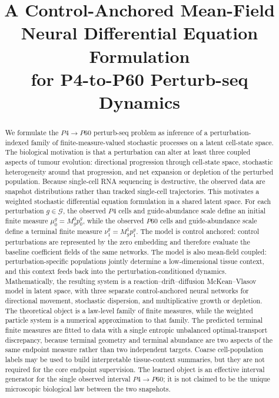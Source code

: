 \documentclass[11pt]{article}
\title{A Control-Anchored Mean-Field Neural Differential Equation Formulation\\for P4-to-P60 Perturb-seq Dynamics}
\author{}
\date{}
\newcommand{\Gcal}{\mathcal{G}}
\begin{document}
\maketitle

\begin{abstract}
We formulate the $P4 \to P60$ perturb-seq problem as inference of a perturbation-indexed family of finite-measure-valued stochastic processes on a latent cell-state space. The biological motivation is that a perturbation can alter at least three coupled aspects of tumour evolution: directional progression through cell-state space, stochastic heterogeneity around that progression, and net expansion or depletion of the perturbed population. Because single-cell RNA sequencing is destructive, the observed data are snapshot distributions rather than tracked single-cell trajectories. This motivates a weighted stochastic differential equation formulation in a shared latent space. For each perturbation $g \in \Gcal$, the observed $P4$ cells and guide-abundance scale define an initial finite measure $\mu_0^g=M_g^0p_0^g$, while the observed $P60$ cells and guide-abundance scale define a terminal finite measure $\nu_1^g=M_g^1p_1^g$. The model is control anchored: control perturbations are represented by the zero embedding and therefore evaluate the baseline coefficient fields of the same networks. The model is also mean-field coupled: perturbation-specific populations jointly determine a low-dimensional tissue context, and this context feeds back into the perturbation-conditioned dynamics. Mathematically, the resulting system is a reaction--drift--diffusion McKean--Vlasov model in latent space, with three separate control-anchored neural networks for directional movement, stochastic dispersion, and multiplicative growth or depletion. The theoretical object is a law-level family of finite measures, while the weighted particle system is a numerical approximation to that family. The predicted terminal finite measures are fitted to data with a single entropic unbalanced optimal-transport discrepancy, because terminal geometry and terminal abundance are two aspects of the same endpoint measure rather than two independent targets. Coarse cell-population labels may be used to build interpretable tissue-context summaries, but they are not required for the core endpoint supervision. The learned object is an effective interval generator for the single observed interval $P4 \to P60$; it is not claimed to be the unique microscopic biological law between the two snapshots.
\end{abstract}
\end{document}
